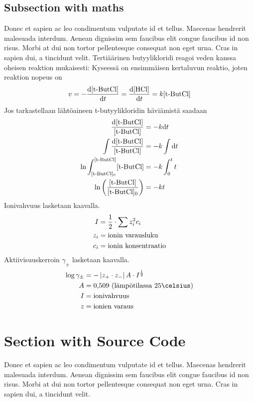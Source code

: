 \subsection{Subsection with \texorpdfstring{\Gls{maths}}{Mathematics}}%
Donec et sapien ac leo condimentum vulputate id et tellus. Maecenas hendrerit malesuada interdum. Aenean dignissim sem faucibus elit congue faucibus id non risus. Morbi at dui non tortor pellentesque consequat non eget urna. Cras in sapien dui, a tincidunt velit. Tertiäärinen butyylikloridi reagoi veden kanssa oheisen reaktion mukaisesti:
Kyseessä on ensimmäisen kertaluvun reaktio, joten reaktion nopeus on
\begin{align}
v=-\frac{\mathrm{d}[\textnormal{t-ButCl}]}{\mathrm{d}t}=\frac{\mathrm{d}[\textnormal{HCl}]}{\mathrm{d}t}=k[\textnormal{t-ButCl}]
\end{align}
Jos tarkastellaan lähtöaineen t-butyylikloridin häviämistä saadaan
\begin{align}
\frac{\mathrm{d}[\textnormal{t-ButCl}]}{[\textnormal{t-ButCl}]}&=-k\mathrm{d}t \\
\int \frac{\mathrm{d}[\textnormal{t-ButCl}]}{[\textnormal{t-ButCl}]}&=-k \int \mathrm{d}t \\
\ln \int_{[\textnormal{t-ButCl}]_0}^{[\textnormal{t-ButCl}]} [\textnormal{t-ButCl}]&=-k\int_0^t t \\
\ln \left( \frac{[\textnormal{t-ButCl}]}{[\textnormal{t-ButCl}]_0} \right)&=-kt
\end{align}
Ionivahvuus lasketaan kaavalla.
\begin{align}
I&=\frac{1}{2}\cdot\sum z_i^2c_i \\
z_i&= \textnormal{ionin varausluku} \nonumber \\
c_i&= \textnormal{ionin konsentraatio} \nonumber
\end{align}
Aktiivisuuskerroin $\gamma_\pm$ lasketaan kaavalla.
\begin{align}
\log \gamma_\pm &= -\left|z_+\cdot z_-\right|A\cdot I^{\frac{1}{2}} \\
A &= \tn{0,509 (lämpötilassa 25\celsius}) \nonumber \\
I &= \tn{ionivahvuus} \nonumber \\
z &= \tn{ionien varaus} \nonumber
\end{align}

\section{Section with Source Code}
Donec et sapien ac leo condimentum vulputate id et tellus. Maecenas hendrerit malesuada interdum. Aenean dignissim sem faucibus elit congue faucibus id non risus. Morbi at dui non tortor pellentesque consequat non eget urna. Cras in sapien dui, a tincidunt velit.


